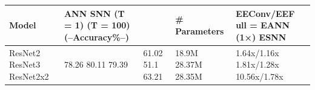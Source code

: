 \begin{tabular}{lllll}
\toprule
Model & ANN SNN (T = 1) (T = 100) (–Accuracy\%–) &  & \# Parameters & EEConv/EEF ull = EANN (1×) ESNN \\
\midrule
ResNet2 ResNet3 ResNet2x2 & 78.26 80.11 79.39 & 61.02 51.1 63.21 & 18.9M 28.37M 28.35M & 1.64x/1.16x 1.81x/1.28x 10.56x/1.78x \\
\bottomrule
\end{tabular}
